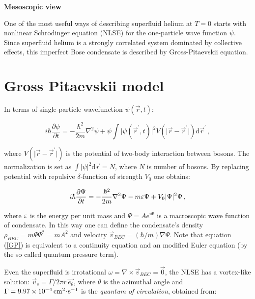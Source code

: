 \newpage

{\Huge \bfseries Mesoscopic view}
\vspace{0.3cm}

One of the most useful ways of describing superfluid helium at $T=0$ starts with nonlinear Schrodinger equation (NLSE) for the one-particle wave function $\psi$. Since superfluid helium is a strongly correlated system dominated by collective effects, this imperfect Bose condensate is described by Gross-Pitaevskii equation.

\section{Gross Pitaevskii model}

In terms of single-particle wavefunction $\psi(\vec{r},t)$:

\begin{equation}
i \hbar \frac{\partial \psi}{\partial t} = - \frac{\hbar^2}{2m} \nabla^2 \psi
+ \psi \int \vert \psi(\vec{r}^{\prime},t) \vert^2 V(\vert \vec{r} - \vec{r}^{\prime} \vert)
\text{d}\vec{r}^{\prime}\,,
\end{equation}

where $V(\vert \vec{r} - \vec{r}^{\prime} \vert)$ is the potential of two-body interaction between bosons. The normalization is set as $\int \vert \psi \vert^2 \text{d}\vec{r} = N$, where $N$ is number of bosons. By replacing potential with repulsive $\delta$-function of strength $V_0$ one obtains:

\begin{equation}
i \hbar \frac{\partial \Psi}{\partial t} = - \frac{\hbar^2}{2m} \nabla^2 \Psi - m\varepsilon \Psi + V_0 \vert \Psi \vert^2 \Psi\,,
\label{GP}
\end{equation}

where $\varepsilon$ is the energy per unit mass and $\Psi = A e^{i\Phi}$ is a macroscopic wave function of condensate. In this way one can define the condensate's density $\rho_{BEC} = m\Psi\Psi^* =  mA^2$ and velocity $\vec{v}_{BEC} = (\hbar / m)\nabla \Psi$. Note that equation (\ref{GP}) is equivalent to a continuity equation and an modified Euler equation (by the so called quantum pressure term).

Even the superfluid is irrotational $\omega = \nabla \times \vec{v}_{BEC} = \vec{0}$, the NLSE has a vortex-like solution: $\vec{v}_s = \Gamma / 2\pi r\, \vec{e_{\theta}}$, where $\theta$ is the azimuthal angle and $\Gamma=9.97 \times 10^{-4} \,\mathrm{cm^2 \!\cdot\! s^{-1}}$ is the \textit{quantum of circulation}, obtained from:

